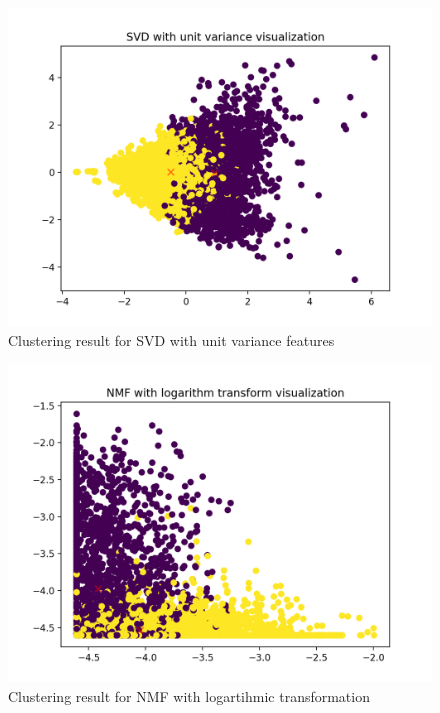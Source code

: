 \documentclass{report}
\begin{document}
\begin{figure}
  \includegraphics[width=\linewidth]{svd_unitvar_4b.png} 
  \vspace*{-20mm}
  \caption{Clustering result for SVD with unit variance features}
  \label{fig:svd2}
\end{figure}

\begin{figure}
  \includegraphics[width=\linewidth]{nmf_log_4b.png} 
  \vspace*{-20mm}
  \caption{Clustering result for NMF with logartihmic transformation}
  \label{fig:nmf3}
\end{figure}
\end{document}
